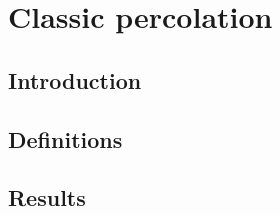 
\chapter{Classic percolation} 

\label{ch:classicpercolation} %



\section{Introduction}\label{sec:introduction}



\section{Definitions}\label{sec:options}



\section{Results}\label{sec:results}
